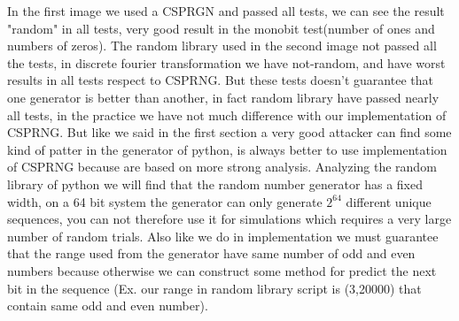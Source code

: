 \documentclass{article}
\begin{document}
In the first image we used a CSPRGN and passed all tests, we can see the result "random" in all tests, very good result in the monobit test(number of ones and numbers of zeros). The random library used in the second image not passed all the tests, in discrete fourier transformation we have not-random, and have worst results in all tests respect to CSPRNG. But these tests doesn't guarantee that one generator is better than another, in fact random library have passed nearly all tests, in the practice we have not much difference with our implementation of CSPRNG. But like we said in the first section a very good attacker can find some kind of patter in the generator of python, is always better to use implementation of CSPRNG because are based on more strong analysis. Analyzing the random library of python we will find that the random number generator has a fixed width, on a 64 bit system the generator can only generate \begin{math}2^{64}\end{math} different unique sequences, you can not therefore use it for simulations which requires a very large number of random trials. Also like we do in implementation we must guarantee that the range used from the generator have same number of odd and even numbers because otherwise we can construct some method for predict the next bit in the sequence (Ex. our range in random library script is (3,20000) that contain same odd and even number).
\end{document}
